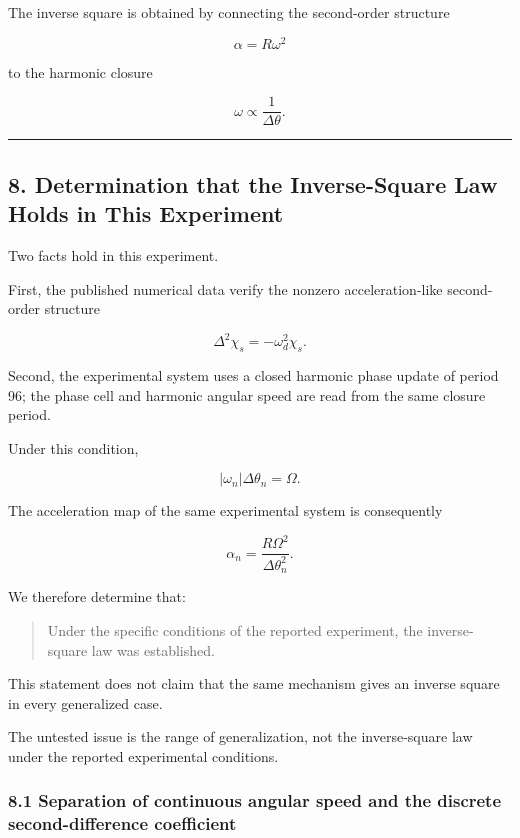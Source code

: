 \documentclass[
  10pt,
  a4paper,
]{article}
\begin{document}
The inverse square is obtained by connecting the second-order structure

\[
\alpha=R\omega^2
\]

to the harmonic closure

\[
\omega\propto\frac{1}{\Delta\theta}.
\]

\begin{center}\rule{0.5\linewidth}{0.5pt}\end{center}

\subsection{8. Determination that the Inverse-Square Law Holds in This
Experiment}\label{determination-that-the-inverse-square-law-holds-in-this-experiment}

Two facts hold in this experiment.

First, the published numerical data verify the nonzero acceleration-like
second-order structure

\[
\Delta^2\chi_s
=-\omega_d^2\chi_s.
\]

Second, the experimental system uses a closed harmonic phase update of
period 96; the phase cell and harmonic angular speed are read from the
same closure period.

Under this condition,

\[
|\omega_n|\Delta\theta_n=\Omega.
\]

The acceleration map of the same experimental system is consequently

\[
\alpha_n
=\frac{R\Omega^2}{\Delta\theta_n^2}.
\]

We therefore determine that:

\begin{quote}
Under the specific conditions of the reported experiment, the
inverse-square law was established.
\end{quote}

This statement does not claim that the same mechanism gives an inverse
square in every generalized case.

The untested issue is the range of generalization, not the
inverse-square law under the reported experimental conditions.

\subsubsection{8.1 Separation of continuous angular speed and the
discrete second-difference
coefficient}\label{separation-of-continuous-angular-speed-and-the-discrete-second-difference-coefficient}
\end{document}
